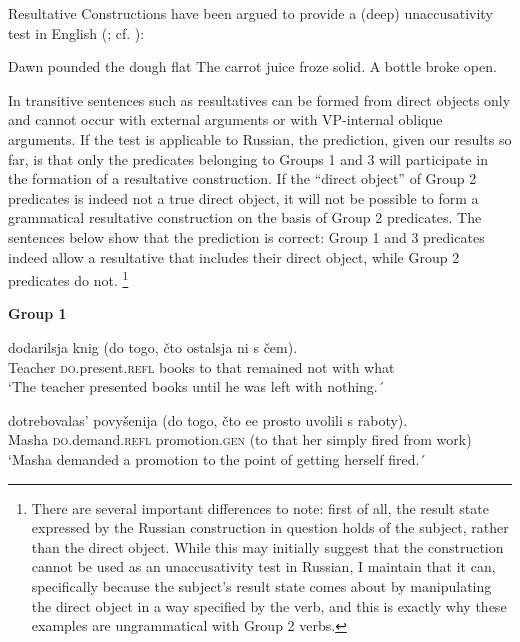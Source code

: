\documentclass[output=paper,colorlinks,citecolor=brown,nonflat]{./langscibook}
\begin{document}
Resultative Constructions have been argued to provide a (deep) unaccusativity test in English (\citealt{LevinRappaportHovav1995}; cf. \citealt{RappaportHovavLevin2001, Kratzer2005}):


\ea%
    \label{ex:antonyuk:28}
    \ea \label{ex:antonyuk:28a}
    Dawn pounded the dough flat \hfill \citep{Irvin2012}
    \ex \label{ex:antonyuk:28b}
    The carrot juice froze solid.
    \ex \label{ex:antonyuk:28c}
    A bottle broke open.
    \z
\z

In transitive sentences such as  resultatives can be formed from direct objects only and cannot occur with external arguments or with VP-internal oblique arguments. If the test is applicable to Russian, the prediction, given our results so far, is that only the predicates belonging to Groups 1 and 3 will participate in the formation of a resultative construction. If the “direct object” of Group 2 predicates is indeed not a true direct object, it will not be possible to form a grammatical resultative construction on the basis of Group 2 predicates. The sentences below show that the prediction is correct: Group 1 and 3 predicates indeed allow a resultative that includes their direct object, while Group 2 predicates do not. \footnote{There are several important differences to note: first of all, the result state expressed by the Russian construction in question holds of the subject, rather than the direct object. While this may initially suggest that the construction cannot be used as an unaccusativity test in Russian, I maintain that it can, specifically because the subject’s result state comes about by manipulating the direct object in a way specified by the verb, and this is exactly why these examples are ungrammatical with Group 2 verbs.}

\textbf{Group 1}

\ea%
    \label{ex:antonyuk:29}
     {dodarilsja} {knig}   {(do} {togo,} {čto} {ostalsja}   {ni}   {s}      {čem)}.\\
    Teacher \textsc{do}.present.\textsc{refl} books to  that    {}     remained not with what\\
    \glt `The teacher presented books until he was left with nothing.´
    \z

\ea%
    \label{ex:antonyuk:30}
       {dotrebovalas’} {povyšenija} {(do} {togo,} {čto} {ee} {prosto} {uvolili} s raboty).\\
    Masha \textsc{do}.demand.\textsc{refl} promotion.\textsc{gen} (to  that     {}     her simply fired from work)\\
    \glt `Masha demanded a promotion to the point of getting herself fired.´
    \z
\end{document}
